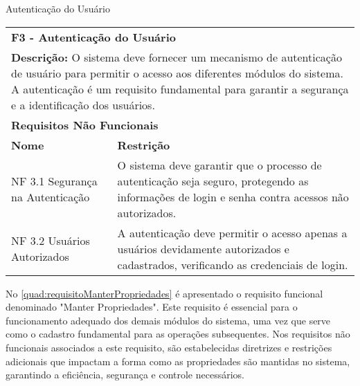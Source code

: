\begin{tabframed}[htb]
  \caption{Autenticação do Usuário}
  \label{quad:requisitoAutenticacaoUsuario}
  \renewcommand{\arraystretch}{1.5}
  \begin{tabular}{|l|l|}
    \cline{1-2}
    \multicolumn{2}{|l|}{\textbf{F3 - Autenticação do Usuário}}
    \\ \cline{1-2}

    \multicolumn{2}{|p{15cm}|}{
    \raggedright \textbf{Descrição:} O sistema deve fornecer um mecanismo de autenticação de usuário para permitir o acesso aos diferentes módulos do sistema. A autenticação é um requisito fundamental para garantir a segurança e a identificação dos usuários.
    }
    \\ \cline{1-2}

    \multicolumn{2}{|l|}{\textbf{Requisitos Não Funcionais}}
    \\ \cline{1-2}

    \textbf{Nome}                    &
    \textbf{Restrição}
    \\ \cline{1-2}

    NF 3.1 Segurança na Autenticação &
    \multicolumn{1}{|p{8cm}|}{\raggedright O sistema deve garantir que o processo de autenticação seja seguro, protegendo as informações de login e senha contra acessos não autorizados.}
    \\ \cline{1-2}

    NF 3.2 Usuários Autorizados      &
    \multicolumn{1}{|p{8cm}|}{\raggedright A autenticação deve permitir o acesso apenas a usuários devidamente autorizados e cadastrados, verificando as credenciais de login.}
    \\ \cline{1-2}
  \end{tabular}
  \fonte{} %
\end{tabframed}

No \autoref{quad:requisitoManterPropriedades} é apresentado o requisito funcional denominado "Manter Propriedades". Este requisito é essencial para o funcionamento adequado dos demais módulos do sistema, uma vez que serve como o cadastro fundamental para as operações subsequentes. Nos requisitos não funcionais associados a este requisito, são estabelecidas diretrizes e restrições adicionais que impactam a forma como as propriedades são mantidas no sistema, garantindo a eficiência, segurança e controle necessários.

